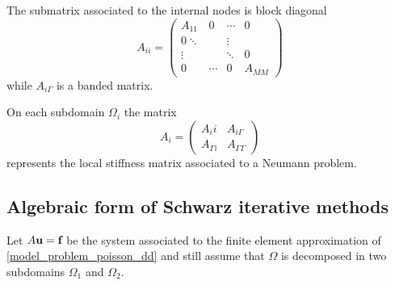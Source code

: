 The submatrix associated to the internal nodes is block diagonal 
\[
    A_{ii} = \left( \begin{matrix}
        A_{11} & 0 & \cdots & 0 \\
        0 \ddots & & \vdots \\
        \vdots & & \ddots & 0 \\
        0 & \cdots & 0 & A_{MM} 
    \end{matrix} \right)
\]
while \(A_{i\Gamma}\) is a banded matrix.
\begin{remark}
    On each subdomain \(\Omega_i\) the matrix 
    \[
        A_i = \left( \begin{matrix}
            A_ii & A_{i \Gamma } \\
            A_{\Gamma i} & A_{\Gamma\Gamma}
        \end{matrix} \right)
    \]
    represents the local stiffness matrix associated to a Neumann problem.
\end{remark}
\subsection{Algebraic form of Schwarz iterative methods}
Let \(A\textbf{u} = \textbf{f}\) be the system associated to the finite element approximation of \eqref{model_problem_poisson_dd} and still assume that \(\Omega\) is decomposed in two subdomains \(\Omega_1\) and \(\Omega_2\).